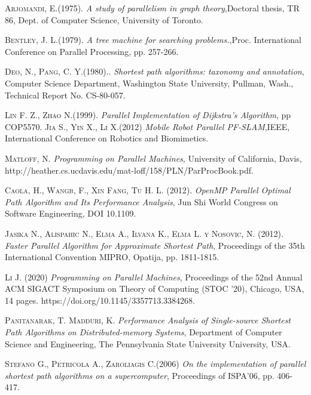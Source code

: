 \documentclass[11pt]{article}
\begin{document}
\begin{thebibliography}{x}
  \textsc{Arjomandi, E.(1975).}
 \textit{A study of parallelism in graph theory},Doctoral thesis, TR 86, Dept. of Computer Science, University of Toronto.
 
  \textsc{Bentley, J. L.(1979).}
 	\textit{A tree machine for searching problems.},Proc. International Conference on Parallel Processing, pp. 257-266. 	
 
   \textsc{Deo, N., Pang, C. Y.(1980).}. \textit{Shortest path algorithms: taxonomy and annotation}, Computer Science Department, Washington State University, Pullman, Wash., Technical Report No. CS-80-057.
 	
 	  \textsc{Lin F. Z., Zhao N.(1999).} 
 	\textit{Parallel Implementation of Dijkstra's Algorithm}, pp COP5570.	   
  \textsc{Jia S., Yin X., Li X.(2012)}
 \textit{Mobile Robot Parallel PF-SLAM},IEEE, International Conference on Robotics and Biomimetics.  

  \textsc{Matloff, N.} 
 	\textit{Programming on Parallel Machines}, University of California, Davis, http://heather.cs.ucdavis.edu/mat-loff/158/PLN/ParProcBook.pdf.
 
  \textsc{Caola, H., Wangb, F., Xin Fang, Tu H. L. (2012).} 
 	\textit{OpenMP Parallel Optimal Path Algorithm and Its Performance Analysis}, Jun Shi World Congress on Software Engineering, DOI 10.1109.
 	
  \textsc{Jasika N., Alispahic N., Elma A., Ilvana K., Elma L. y Nosovic, N. (2012).} 
 	\textit{Faster Parallel Algorithm for Approximate Shortest Path}, Proceedings of the 35th International Convention MIPRO, Opatija, pp. 1811-1815.
 	
  \textsc{Li J. (2020)} 
 	\textit{Programming on Parallel Machines}, Proceedings of the 52nd Annual ACM SIGACT Symposium on Theory of Computing (STOC ’20), Chicago,  USA, 14 pages. https://doi.org/10.1145/3357713.3384268.

  \textsc{Panitanarak, T. Madduri, K.} 
 	\textit{Performance Analysis of Single-source Shortest Path Algorithms on Distributed-memory Systems}, Department of Computer Science and Engineering, The Pennsylvania State University
University, USA.

  \textsc{Stefano G., Petricola A., Zaroliagis C.(2006)} 
 	\textit{On the implementation of parallel shortest path algorithms on a supercomputer}, Proceedings of ISPA’06, pp. 406-417.


\end{thebibliography}
\end{document}
